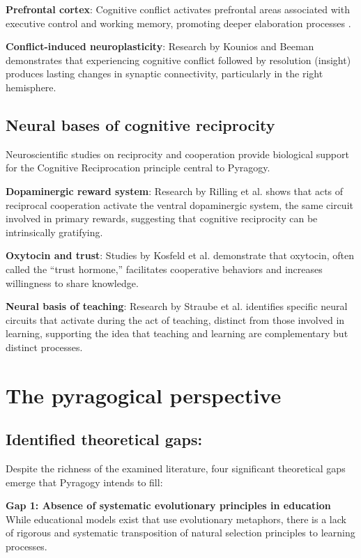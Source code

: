 \textbf{Prefrontal cortex}: Cognitive conflict activates prefrontal areas associated with executive control and working memory, promoting deeper elaboration processes \cite{Miller2001}.

\textbf{Conflict-induced neuroplasticity}: Research by Kounios and Beeman \cite{Kounios2014} demonstrates that experiencing cognitive conflict followed by resolution (insight) produces lasting changes in synaptic connectivity, particularly in the right hemisphere.

\subsection{Neural bases of cognitive reciprocity}

Neuroscientific studies on reciprocity and cooperation provide biological support for the Cognitive Reciprocation principle central to Pyragogy.

\textbf{Dopaminergic reward system}: Research by Rilling et al. \cite{Rilling2002} shows that acts of reciprocal cooperation activate the ventral dopaminergic system, the same circuit involved in primary rewards, suggesting that cognitive reciprocity can be intrinsically gratifying.

\textbf{Oxytocin and trust}: Studies by Kosfeld et al. \cite{Kosfeld2005} demonstrate that oxytocin, often called the ``trust hormone,'' facilitates cooperative behaviors and increases willingness to share knowledge.

\textbf{Neural basis of teaching}: Research by Straube et al. \cite{Straube2009} identifies specific neural circuits that activate during the act of teaching, distinct from those involved in learning, supporting the idea that teaching and learning are complementary but distinct processes.

\newpage
\section{The pyragogical perspective}
\subsection*{Identified theoretical gaps:}

Despite the richness of the examined literature, four significant theoretical gaps emerge that Pyragogy intends to fill:

\textbf{Gap 1: Absence of systematic evolutionary principles in education}
While educational models exist that use evolutionary metaphors, there is a lack of rigorous and systematic transposition of natural selection principles to learning processes.

